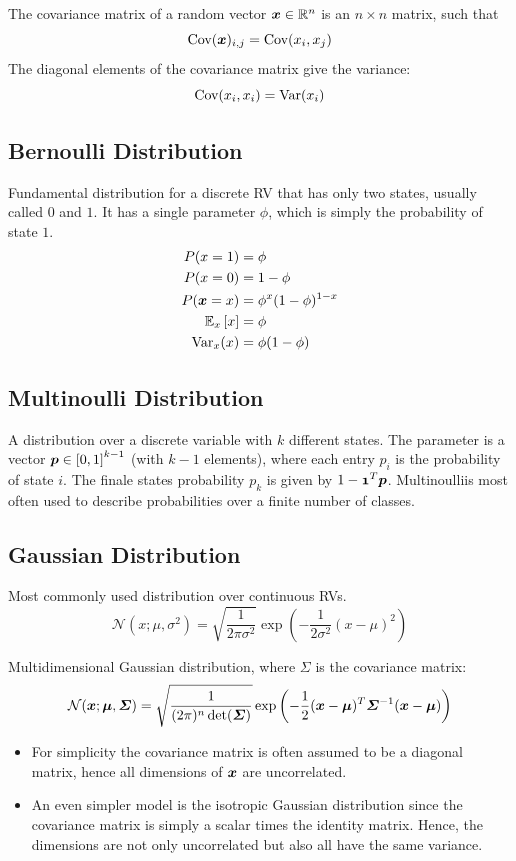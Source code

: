 \begin{multicols}{2}
	The covariance matrix of a random vector $\bol{x}\in \mathbb{R}^n$ is an $n\times n$ matrix, such that
	\[ \cov(\bol{x})_{i,j}=\cov(x_i,x_j) \]
	The diagonal elements of the covariance matrix give the variance:
	\[ \text{Cov}(x_i,x_i) = \text{Var}(x_i) \]

	\subsection{Bernoulli Distribution}
	Fundamental distribution for a discrete RV that has only two states, usually called $0$ and $1$.
	It has a single parameter $\phi$, which is simply the probability of state $1$.
	\begin{align*}
	P(x=1) &= \phi \\
	P(x=0) &= 1-\phi\\
	P(\bol{x}=x) &= \phi^x(1-\phi)^{1-x}\\
	\Exp_x\left[x\right] &= \phi\\
	\var_x(x) &= \phi(1-\phi)
	\end{align*}

	\subsection{Multinoulli Distribution}
	A distribution over a discrete variable with $k$ different states.
	The parameter is a vector $\bol{p} \in \left[0,1\right]^{k-1}$ (with $k-1$ elements), where each entry $p_i$ is the probability of state $i$.
	The finale states probability $p_k$ is given by $1-\bol{1}^T\bol{p}$.
	Multinoulliis most often used to describe probabilities over a finite number of classes.

	\subsection{Gaussian Distribution}
	Most commonly used distribution over continuous RVs.
	\[ \mathcal{N}(x;\mu,\sigma^2) = \sqrt{\frac{1}{2\pi\sigma^2}}\exp\left(-\frac{1}{2\sigma^2}(x-\mu)^2\right) \]

	Multidimensional Gaussian distribution, where $\Sigma$ is the covariance matrix:
	\[ \mathcal{N}(\bol{x}; \bol{\mu},\bol{\Sigma}) =
	\sqrt{\frac{1}{(2\pi)^n\det(\bol{\Sigma})}}
	\exp \left( -\frac{1}{2} (\bol{x}-\bol{\mu})^T\bol{\Sigma}^{-1}(\bol{x}-\bol{\mu}) \right) \]

	\begin{itemize}
		\item For simplicity the covariance matrix is often assumed to be a diagonal matrix, hence all dimensions of $\bol{x}$ are uncorrelated.
		\item An even simpler model is the isotropic Gaussian distribution since the covariance matrix is simply a scalar times the identity matrix. Hence, the dimensions are not only uncorrelated but also all have the same variance.
	\end{itemize}


\end{multicols}
